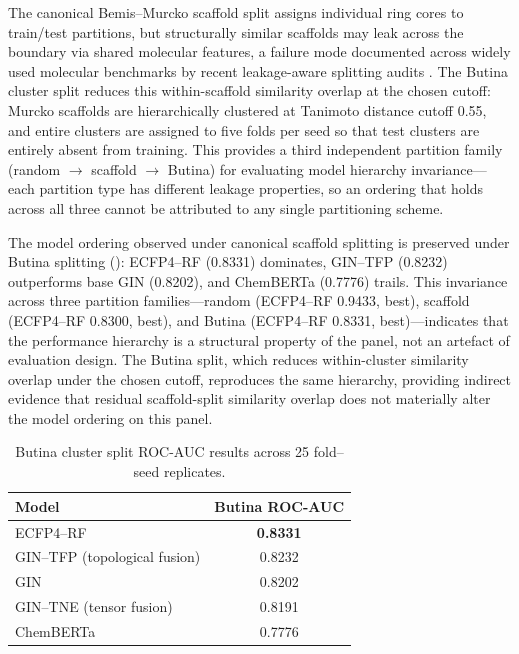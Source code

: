 \documentclass[11pt,a4paper]{article}
\begin{document}
The canonical Bemis--Murcko scaffold split assigns individual ring cores to train/test partitions, but structurally similar scaffolds may leak across the boundary via shared molecular features, a failure mode documented across widely used molecular benchmarks by recent leakage-aware splitting audits \citep{joeres2025datasail,joeres2026datasailaddendum}. The Butina cluster split \citep{butina1999} reduces this within-scaffold similarity overlap at the chosen cutoff: Murcko scaffolds are hierarchically clustered at Tanimoto distance cutoff \num{0.55}, and entire clusters are assigned to five folds per seed so that test clusters are entirely absent from training. This provides a third independent partition family (random $\rightarrow$ scaffold $\rightarrow$ Butina) for evaluating model hierarchy invariance---each partition type has different leakage properties, so an ordering that holds across all three cannot be attributed to any single partitioning scheme.

The model ordering observed under canonical scaffold splitting is preserved under Butina splitting (): ECFP4--RF (\num{0.8331}) dominates, GIN--TFP (\num{0.8232}) outperforms base GIN (\num{0.8202}), and ChemBERTa (\num{0.7776}) trails. This invariance across three partition families---random (ECFP4--RF \num{0.9433}, best), scaffold (ECFP4--RF \num{0.8300}, best), and Butina (ECFP4--RF \num{0.8331}, best)---indicates that the performance hierarchy is a structural property of the panel, not an artefact of evaluation design. The Butina split, which reduces within-cluster similarity overlap under the chosen cutoff, reproduces the same hierarchy, providing indirect evidence that residual scaffold-split similarity overlap \citep{bash2025umap} does not materially alter the model ordering on this panel.

\begin{table}[h]
\centering
\caption{Butina cluster split ROC-AUC results across \num{25} fold--seed replicates.}
\label{tab:s6_butina}
\begin{tabular}{lc}
\toprule
Model & Butina ROC-AUC \\
\midrule
ECFP4--RF & \textbf{\num{0.8331}} \\
GIN--TFP (topological fusion) & \num{0.8232} \\
GIN & \num{0.8202} \\
GIN--TNE (tensor fusion) & \num{0.8191} \\
ChemBERTa & \num{0.7776} \\
\bottomrule
\end{tabular}
\end{table}
\end{document}
